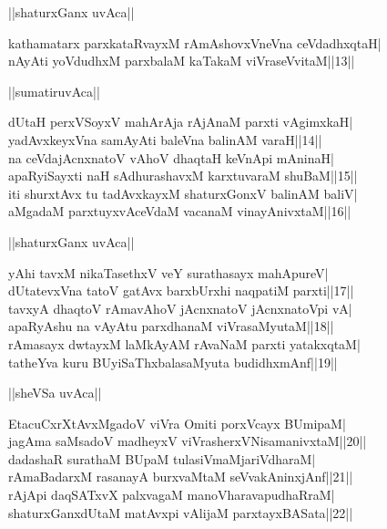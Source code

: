 \documentclass{article}
\begin{document}
\begin{center}
||shaturxGanx uvAca||
\end{center}

kathamatarx parxkataRvayxM rAmAshovxVneVna ceVdadhxqtaH|\\
nAyAti yoVdudhxM parxbalaM kaTakaM viVraseVvitaM||13||\\

\begin{center}
||sumatiruvAca||
\end{center}

dUtaH perxVSoyxV mahArAja rAjAnaM parxti vAgimxkaH|\\
yadAvxkeyxVna samAyAti baleVna balinAM varaH||14||\\
na ceVdajAcnxnatoV vAhoV dhaqtaH keVnApi mAninaH|\\
apaRyiSayxti naH sAdhurashavxM karxtuvaraM shuBaM||15||\\
iti shurxtAvx tu tadAvxkayxM shaturxGonxV balinAM baliV|\\
aMgadaM parxtuyxvAceVdaM vacanaM vinayAnivxtaM||16||\\

\begin{center}
||shaturxGanx uvAca||
\end{center}

yAhi tavxM nikaTasethxV veY surathasayx mahApureV|\\
dUtatevxVna tatoV gatAvx barxbUrxhi naqpatiM parxti||17||\\
tavxyA dhaqtoV rAmavAhoV jAcnxnatoV jAcnxnatoVpi vA|\\
apaRyAshu na vAyAtu parxdhanaM viVrasaMyutaM||18||\\
rAmasayx dwtayxM laMkAyAM rAvaNaM parxti yatakxqtaM|\\
tatheYva kuru BUyiSaThxbalasaMyuta budidhxmAnf||19||\\

\begin{center}
||sheVSa uvAca||
\end{center}

EtacuCxrXtAvxMgadoV viVra Omiti porxVcayx BUmipaM|\\
jagAma saMsadoV madheyxV viVrasherxVNisamanivxtaM||20||\\
dadashaR surathaM BUpaM tulasiVmaMjariVdharaM|\\
rAmaBadarxM rasanayA burxvaMtaM seVvakAninxjAnf||21||\\
rAjApi daqSATxvX palxvagaM manoVharavapudhaRraM|\\
shaturxGanxdUtaM matAvxpi vAlijaM parxtayxBASata||22||\\
\end{document}
